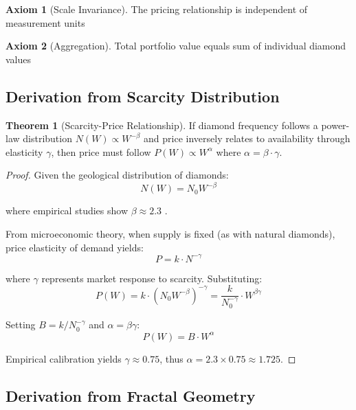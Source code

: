 \documentclass[12pt,a4paper]{article}
\theoremstyle{definition}
\newtheorem{theorem}{Theorem}
\newtheorem{axiom}{Axiom}
\theoremstyle{remark}
\begin{document}
\begin{axiom}[Scale Invariance]
The pricing relationship is independent of measurement units
\end{axiom}

\begin{axiom}[Aggregation]
Total portfolio value equals sum of individual diamond values
\end{axiom}

\subsection{Derivation from Scarcity Distribution}

\begin{theorem}[Scarcity-Price Relationship]
If diamond frequency follows a power-law distribution $N(W) \propto W^{-\beta}$ and price inversely relates to availability through elasticity $\gamma$, then price must follow $P(W) \propto W^{\alpha}$ where $\alpha = \beta \cdot \gamma$.
\end{theorem}

\begin{proof}
Given the geological distribution of diamonds:
\begin{equation}
N(W) = N_0 W^{-\beta}
\end{equation}

where empirical studies show $\beta \approx 2.3$ \citep{harlow1998nature}.

From microeconomic theory, when supply is fixed (as with natural diamonds), price elasticity of demand yields:
\begin{equation}
P = k \cdot N^{-\gamma}
\end{equation}

where $\gamma$ represents market response to scarcity. Substituting:
\begin{equation}
P(W) = k \cdot (N_0 W^{-\beta})^{-\gamma} = \frac{k}{N_0^{-\gamma}} \cdot W^{\beta \gamma}
\end{equation}

Setting $B = k/N_0^{-\gamma}$ and $\alpha = \beta \gamma$:
\begin{equation}
P(W) = B \cdot W^{\alpha}
\end{equation}

Empirical calibration yields $\gamma \approx 0.75$, thus $\alpha = 2.3 \times 0.75 \approx 1.725$.
\end{proof}

\subsection{Derivation from Fractal Geometry}
\end{document}
